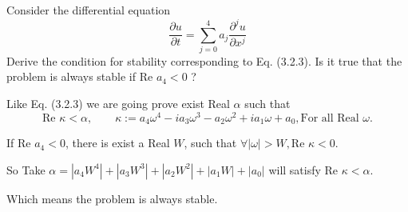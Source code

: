\exc Consider the differential equation
\[\frac{\partial u}{\partial t} = \sum_{j = 0}^{4}a_j \frac{\partial^j u}{\partial x^j} \]
Derive the condition for stability corresponding to Eq. (3.2.3). Is it true
that the problem is always stable if Re $a_4 < 0$ ?

\begin{solution}
  Like Eq. (3.2.3) we are going prove exist Real $\alpha$ such that
  \[\text{Re } \kappa < \alpha, \qquad \kappa := a_4 \omega ^4 
  - ia_3 \omega^3 - a_2 \omega^2 + ia_1 \omega + a_0, 
  \text{For all Real } \omega.\]

  If Re $a_4 < 0$, there is exist a Real $W$, 
    such that $\forall |\omega| > W, \text{Re } \kappa < 0$.

    So Take $\alpha = |a_4 W^4| + |a_3 W^3| + |a_2 W^2| + 
    |a_1 W| + |a_0|$ will satisfy $\text{Re } \kappa < \alpha$.

    Which means the problem is always stable.


\end{solution}
